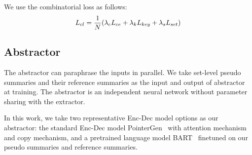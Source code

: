 We use the combinatorial loss as follows:
\begin{equation}
\label{func:loss}
\small
L_{cl} = \frac{1}{N} (\lambda_{c}L_{ce} + \lambda_{k}L_{key} + \lambda_{s}L_{set})
\end{equation}


\subsection{Abstractor}
\label{sec:abs}
The abstractor can paraphrase the inputs in parallel.
We take set-level pseudo summaries and their reference summaries 
as the input and output of abstractor at training.
The abstractor is an independent neural network without parameter sharing with
the extractor.

In this work, we take two representative Enc-Dec model options 
as our abstractor: the standard Enc-Dec model PointerGen~\cite{SeeLM17} 
with attention mechanism~\cite{luong15} and copy mechanism,
and a pretrained language model BART~\cite{BART19} 
finetuned on our pseudo summaries and reference summaries.

